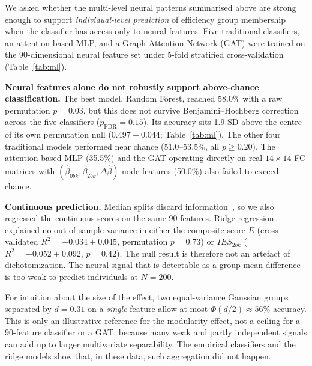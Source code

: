 \documentclass[conference]{IEEEtran}
\begin{document}
We asked whether the multi-level neural patterns summarised above are strong enough to support \emph{individual-level prediction} of efficiency group membership when the classifier has access only to neural features. Five traditional classifiers, an attention-based MLP, and a Graph Attention Network (GAT) were trained on the 90-dimensional neural feature set under 5-fold stratified cross-validation (Table~\ref{tab:ml}).

\textbf{Neural features alone do not robustly support above-chance classification.} The best model, Random Forest, reached 58.0\% with a raw permutation $p=0.03$, but this does not survive Benjamini--Hochberg correction across the five classifiers ($p_{\mathrm{FDR}}=0.15$). Its accuracy sits 1.9 SD above the centre of its own permutation null ($0.497\pm0.044$; Table~\ref{tab:ml}). The other four traditional models performed near chance (51.0--53.5\%, all $p\geq 0.20$). The attention-based MLP (35.5\%) and the GAT operating directly on real $14\times 14$ FC matrices with $(\hat{\beta}_{0bk}, \hat{\beta}_{2bk}, \Delta\hat{\beta})$ node features (50.0\%) also failed to exceed chance.

\textbf{Continuous prediction.} Median splits discard information~\cite{maccallum2002practice}, so we also regressed the continuous scores on the same 90 features. Ridge regression explained no out-of-sample variance in either the composite score $E$ (cross-validated $R^2=-0.034\pm0.045$, permutation $p=0.73$) or $IES_{2bk}$ ($R^2=-0.052\pm0.092$, $p=0.42$). The null result is therefore not an artefact of dichotomization. The neural signal that is detectable as a group mean difference is too weak to predict individuals at $N=200$.

For intuition about the size of the effect, two equal-variance Gaussian groups separated by $d=0.31$ on a \emph{single} feature allow at most $\Phi(d/2)\approx 56\%$ accuracy. This is only an illustrative reference for the modularity effect, not a ceiling for a 90-feature classifier or a GAT, because many weak and partly independent signals can add up to larger multivariate separability. The empirical classifiers and the ridge models show that, in these data, such aggregation did not happen.
\end{document}
